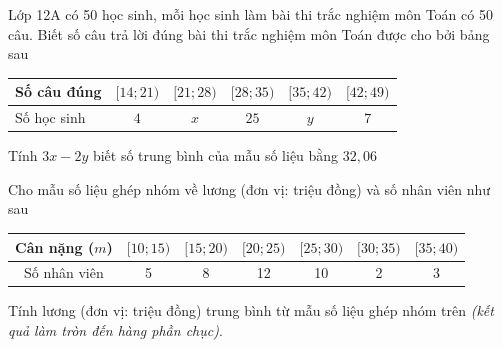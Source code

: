 \begin{bt}%
    Lớp 12A có 50 học sinh, mỗi học sinh làm bài thi trắc nghiệm môn Toán có 50 câu. Biết số câu trả lời đúng bài thi trắc nghiệm môn Toán được cho bởi bảng sau
    \begin{center}
        \begin{tabular}{|l|c|c|c|c|c|}
            \hline
            Số câu đúng & $[14;21)$ & $[21;28)$ & $[28;35)$ & $[35;42)$ & $[42;49)$ \\
            \hline
            Số học sinh & $4$ & $x$ & $25$ & $y$ & $7$ \\
            \hline
        \end{tabular}
    \end{center}
    Tính $3x-2y$ biết số trung bình của mẫu số liệu bằng $32{,}06$
\end{bt}

\begin{bt}%
	 Cho mẫu số liệu ghép nhóm về lương (đơn vị: triệu đồng) và số nhân viên như sau
	\begin{center}
		\begin{tabular}{|c|c|c|c|c|c|c|}
			\hline Cân nặng ($m$) &{$[10;15)$}&{$[15;20)$}&{$[20;25)$}&{$[25;30)$}&{$[30;35)$}&{$[35;40)$}\\
			\hline Số nhân viên & 5 & 8 & 12 & 10 & 2 & 3 \\
			\hline
		\end{tabular}
	\end{center}
	Tính lương (đơn vị: triệu đồng) trung bình từ mẫu số liệu ghép nhóm trên {\it (kết quả làm tròn đến hàng phần chục)}.
\end{bt}

